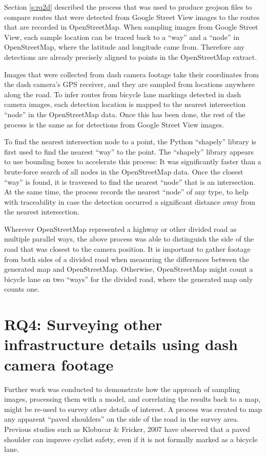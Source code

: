 \documentclass[11pt,twoside]{report}
\begin{document}
Section \ref{s:rq2d} described the process that was used to produce geojson files to compare routes that were detected from Google Street View images to the routes that are recorded in OpenStreetMap.  When sampling images from Google Street View, each sample location can be traced back to a ``way'' and a ``node'' in OpenStreetMap, where the latitude and longitude came from.  Therefore any detections are already precisely aligned to points in the OpenStreetMap extract.

Images that were collected from dash camera footage take their coordinates from the dash camera's GPS receiver, and they are sampled from locations anywhere along the road.  To infer routes from bicycle lane markings detected in dash camera images, each detection location is mapped to the nearest intersection ``node'' in the OpenStreetMap data.  Once this has been done, the rest of the process is the same as for detections from Google Street View images.

To find the nearest intersection node to a point, the Python ``shapely'' library is first used to find the nearest ``way'' to the point.  The ``shapely'' library appears to use bounding boxes to accelerate this process:  It was significantly faster than a brute-force search of all nodes in the OpenStreetMap data.  Once the closest ``way'' is found, it is traversed to find the nearest ``node'' that is an intersection.  At the same time, the process records the nearest ``node'' of any type, to help with traceability in case the detection occurred a significant distance away from the nearest intersection.

Wherever OpenStreetMap represented a highway or other divided road as multiple parallel ways, the above process was able to distinguish the side of the road that was closest to the camera position.  It is important to gather footage from both sides of a divided road when measuring the differences between the generated map and OpenStreetMap.  Otherwise, OpenStreetMap might count a bicycle lane on two ``ways'' for the divided road, where the generated map only counts one.


\section{RQ4: Surveying other infrastructure details using dash camera footage}
\label{s:rq4}

Further work was conducted to demonstrate how the approach of sampling images, processing them with a model, and correlating the results back to a map, might be re-used to survey other details of interest.  A process was created to map any apparent ``paved shoulders'' on the side of the road in the survey area.  Previous studies such as Klobucar \& Fricker, 2007 \cite{BIKESAFETY} have observed that a paved shoulder can improve cyclist safety, even if it is not formally marked as a bicycle lane.
\end{document}
